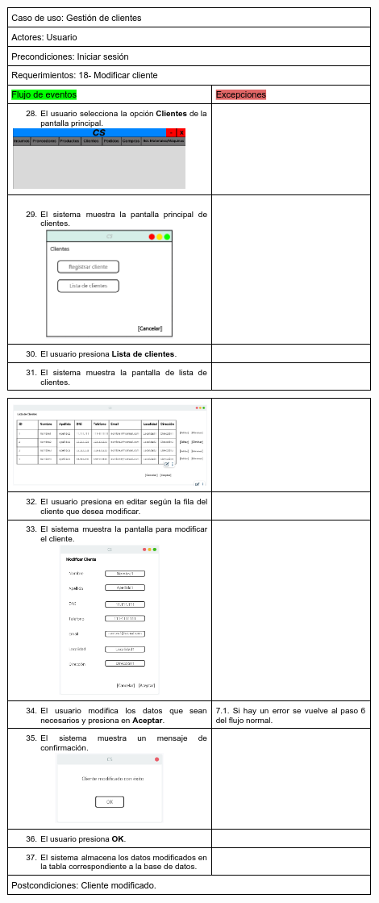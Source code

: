 \documentclass{article}
\begin{document}
	\begin{center}
		\includegraphics[width=1\linewidth]{imagenes/18_especificacion_clientes.png}
		\includegraphics[width=1\linewidth]{imagenes/18_especificacion_clientes2.png}
	\end{center}
\end{document}
